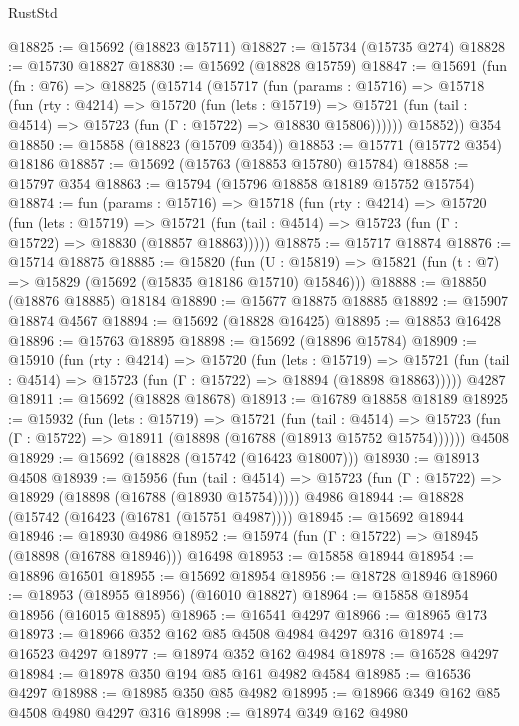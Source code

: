 \begin{lexlean}{RustStd}
\begin{coremodule}
@18825 := @15692 (@18823 @15711)
@18827 := @15734 (@15735 @274)
@18828 := @15730 @18827
@18830 := @15692 (@18828 @15759)
@18847 := @15691
    (fun (fn : @76) =>
    @18825
      (@15714
        (@15717
          (fun (params : @15716) =>
          @15718
            (fun (rty : @4214) =>
            @15720
              (fun (lets : @15719) =>
              @15721 (fun (tail : @4514) => @15723 (fun (Γ : @15722) => @18830 @15806))))))
        @15852))
    @354
@18850 := @15858 (@18823 (@15709 @354))
@18853 := @15771 (@15772 @354) @18186
@18857 := @15692 (@15763 (@18853 @15780) @15784)
@18858 := @15797 @354
@18863 := @15794 (@15796 @18858 @18189 @15752 @15754)
@18874 := fun (params : @15716) =>
  @15718
    (fun (rty : @4214) =>
    @15720
      (fun (lets : @15719) =>
      @15721 (fun (tail : @4514) => @15723 (fun (Γ : @15722) => @18830 (@18857 @18863)))))
@18875 := @15717 @18874
@18876 := @15714 @18875
@18885 := @15820
    (fun (U : @15819) => @15821 (fun (t : @7) => @15829 (@15692 (@15835 @18186 @15710) @15846)))
@18888 := @18850 (@18876 @18885) @18184
@18890 := @15677 @18875 @18885
@18892 := @15907 @18874 @4567
@18894 := @15692 (@18828 @16425)
@18895 := @18853 @16428
@18896 := @15763 @18895
@18898 := @15692 (@18896 @15784)
@18909 := @15910
    (fun (rty : @4214) =>
    @15720
      (fun (lets : @15719) =>
      @15721 (fun (tail : @4514) => @15723 (fun (Γ : @15722) => @18894 (@18898 @18863)))))
    @4287
@18911 := @15692 (@18828 @18678)
@18913 := @16789 @18858 @18189
@18925 := @15932
    (fun (lets : @15719) =>
    @15721
      (fun (tail : @4514) =>
      @15723 (fun (Γ : @15722) => @18911 (@18898 (@16788 (@18913 @15752 @15754))))))
    @4508
@18929 := @15692 (@18828 (@15742 (@16423 @18007)))
@18930 := @18913 @4508
@18939 := @15956
    (fun (tail : @4514) => @15723 (fun (Γ : @15722) => @18929 (@18898 (@16788 (@18930 @15754)))))
    @4986
@18944 := @18828 (@15742 (@16423 (@16781 (@15751 @4987))))
@18945 := @15692 @18944
@18946 := @18930 @4986
@18952 := @15974 (fun (Γ : @15722) => @18945 (@18898 (@16788 @18946))) @16498
@18953 := @15858 @18944
@18954 := @18896 @16501
@18955 := @15692 @18954
@18956 := @18728 @18946
@18960 := @18953 (@18955 @18956) (@16010 @18827)
@18964 := @15858 @18954 @18956 (@16015 @18895)
@18965 := @16541 @4297
@18966 := @18965 @173
@18973 := @18966 @352 @162 @85 @4508 @4984 @4297 @316
@18974 := @16523 @4297
@18977 := @18974 @352 @162 @4984
@18978 := @16528 @4297
@18984 := @18978 @350 @194 @85 @161 @4982 @4584
@18985 := @16536 @4297
@18988 := @18985 @350 @85 @4982
@18995 := @18966 @349 @162 @85 @4508 @4980 @4297 @316
@18998 := @18974 @349 @162 @4980

\end{coremodule}
\end{lexlean}
